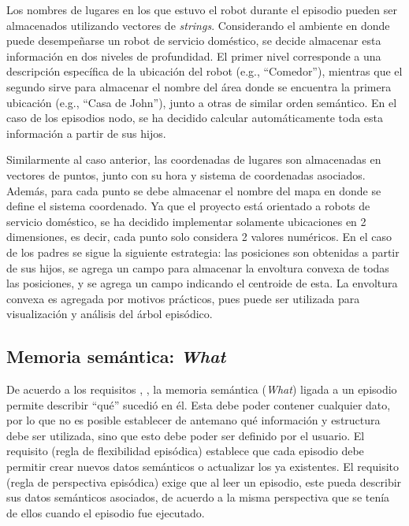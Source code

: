 Los nombres de lugares en los que estuvo el robot durante el episodio pueden ser almacenados utilizando vectores de \textit{strings}. Considerando el ambiente en donde puede desempeñarse un robot de servicio doméstico, se decide almacenar esta información en dos niveles de profundidad. El primer nivel corresponde a una descripción específica de la ubicación del robot (e.g., ``Comedor''), mientras que el segundo sirve para almacenar el nombre del área donde se encuentra la primera ubicación (e.g., ``Casa de John''), junto a otras de similar orden semántico. En el caso de los episodios nodo, se ha decidido calcular automáticamente toda esta información a partir de sus hijos.

Similarmente al caso anterior, las coordenadas de lugares son almacenadas en vectores de puntos, junto con su hora y sistema de coordenadas asociados. Además, para cada punto se debe almacenar el nombre del mapa en donde se define el sistema coordenado. Ya que el proyecto está orientado a robots de servicio doméstico, se ha decidido implementar solamente ubicaciones en 2 dimensiones, es decir, cada punto solo considera 2 valores numéricos. En el caso de los padres se sigue la siguiente estrategia: las posiciones son obtenidas a partir de sus hijos, se agrega un campo para almacenar la envoltura convexa de todas las posiciones, y se agrega un campo indicando el centroide de esta. La envoltura convexa es agregada por motivos prácticos, pues puede ser utilizada para visualización y análisis del árbol episódico.



\subsection{Memoria semántica: \textit{What}}\label{sec:design_ep_what}

De acuerdo a los requisitos , , la memoria semántica (\textit{What}) ligada a un episodio permite describir ``qué'' sucedió en él. Esta debe poder  contener cualquier dato, por lo que no es posible establecer de antemano qué información y estructura debe ser utilizada, sino que esto debe poder ser definido por el usuario. El requisito  (regla de flexibilidad episódica) establece que cada episodio debe permitir crear nuevos datos semánticos o actualizar los ya existentes. El requisito  (regla de perspectiva episódica) exige que al leer un episodio, este pueda describir sus datos semánticos asociados, de acuerdo a la misma perspectiva que se tenía de ellos cuando el episodio fue ejecutado.

